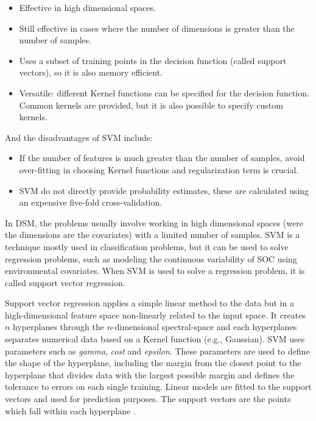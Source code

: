 \documentclass[10pt,b5paper,]{book}
\providecommand{\tightlist}{%
  \setlength{\itemsep}{0pt}\setlength{\parskip}{0pt}}
\theoremstyle{definition}
\theoremstyle{definition}
\theoremstyle{definition}
\theoremstyle{remark}
\begin{document}
\begin{itemize}
\tightlist
\item
  Effective in high dimensional spaces.
\item
  Still effective in cases where the number of dimensions is greater
  than the number of samples.
\item
  Uses a subset of training points in the decision function (called
  support vectors), so it is also memory efficient.
\item
  Versatile: different Kernel functions can be specified for the
  decision function. Common kernels are provided, but it is also
  possible to specify custom kernels.
\end{itemize}

And the disadvantages of SVM include:

\begin{itemize}
\tightlist
\item
  If the number of features is much greater than the number of samples,
  avoid over-fitting in choosing Kernel functions and regularization
  term is crucial.
\item
  SVM do not directly provide probability estimates, these are
  calculated using an expensive five-fold cross-validation.
\end{itemize}

In DSM, the problems usually involve working in high dimensional spaces
(were the dimensions are the covariates) with a limited number of
samples. SVM is a technique mostly used in classification problems, but
it can be used to solve regression problems, such as modeling the
continuous variability of SOC using environmental covariates. When SVM
is used to solve a regression problem, it is called support vector
regression.

Support vector regression applies a simple linear method to the data but
in a high-dimensional feature space non-linearly related to the input
space. It creates \(n\) hyperplanes through the \(n\)-dimensional
spectral-space and each hyperplanes separates numerical data based on a
Kernel function (e.g., Gaussian). SVM uses parameters such as
\emph{gamma}, \emph{cost} and \emph{epsilon}. These parameters are used
to define the shape of the hyperplane, including the margin from the
closest point to the hyperplane that divides data with the largest
possible margin and defines the tolerance to errors on each single
training. Linear models are fitted to the support vectors and used for
prediction purposes. The support vectors are the points which fall
within each hyperplane \citep{guevara_2018}.
\end{document}
